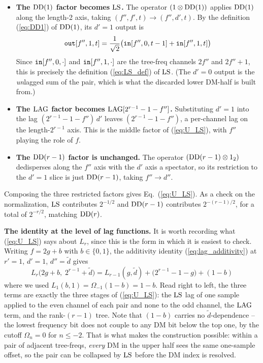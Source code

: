 \documentclass{article}
\numberwithin{equation}{section}   %
\def\DD{{\rm DD}}
\def\LS{{\rm LS}}
\def\LAG{{\rm LAG}}
\begin{document}
\begin{itemize}

\item {\bf The $\DD(1)$ factor becomes $\LS$.} The operator $(1 \otimes \DD(1))$ applies
$\DD(1)$ along the length-2 axis, taking $(f'',f',t) \to (f'',d',t)$. By the definition
(\ref{eq:DD1}) of $\DD(1)$, its $d'=1$ output is
\begin{equation}
{\tt out}[f'',1,t] = \frac{1}{\sqrt 2} \big( {\tt in}[f'',0,t-1] + {\tt in}[f'',1,t] \big)
\end{equation}
Since ${\tt in}[f'',0,\cdot]$ and ${\tt in}[f'',1,\cdot]$ are the tree-freq channels $2f''$ and
$2f''+1$, this is precisely the definition (\ref{eq:LS_def}) of $\LS$. (The $d'=0$ output is
the {\em un}lagged sum of the pair, which is what the discarded lower DM-half is built from.)

\item {\bf The $\LAG$ factor becomes $\LAG[2^{r-1}-1-f'']$.} Substituting $d'=1$ into the lag
$(2^{r-1}-1-f'')\,d'$ leaves $(2^{r-1}-1-f'')$, a per-channel lag on the length-$2^{r-1}$ axis.
This is the middle factor of (\ref{eq:U_LS}), with $f''$ playing the role of $f$.

\item {\bf The $\DD(r-1)$ factor is unchanged.} The operator $(\DD(r-1) \otimes 1_2)$ dedisperses
along the $f''$ axis with the $d'$ axis a spectator, so its restriction to the $d'=1$ slice is
just $\DD(r-1)$, taking $f'' \to d''$.

\end{itemize}

\par\noindent
Composing the three restricted factors gives Eq.\ (\ref{eq:U_LS}). As a check on the
normalization, $\LS$ contributes $2^{-1/2}$ and $\DD(r-1)$ contributes $2^{-(r-1)/2}$, for a
total of $2^{-r/2}$, matching $\DD(r)$.

\par\noindent
{\bf The identity at the level of lag functions.} It is worth recording what
(\ref{eq:U_LS}) says about $L_r$, since this is the form in which it is easiest to check.
Writing $f = 2g+b$ with $b \in \{0,1\}$, the additivity identity (\ref{eq:lag_additivity})
at $r'=1$, $d'=1$, $d''=\tilde d$ gives
\begin{equation}
L_r\big(2g+b,\; 2^{r-1}+\tilde d\big)
  = L_{r-1}(g, \tilde d) + \big(2^{r-1}-1-g\big) + (1-b)
\label{eq:uh_lag}
\end{equation}
where we used $L_1(b,1) = \Omega_{-1}(1-b) = 1-b$. Read right to left, the three terms are
exactly the three stages of (\ref{eq:U_LS}): the $\LS$ lag of one sample applied to the even
channel of each pair and none to the odd channel, the $\LAG$ term, and the rank-$(r-1)$ tree.
Note that $(1-b)$ carries no $\tilde d$-dependence -- the lowest frequency bit does not couple
to any DM bit below the top one, by the cutoff $\Omega_n = 0$ for $n \le -2$. That is what makes
the construction possible: within a pair of adjacent tree-freqs, {\em every} DM in the upper half
sees the same one-sample offset, so the pair can be collapsed by $\LS$ before the DM index is
resolved.
\end{document}
